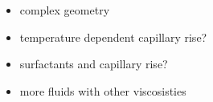 \begin{itemize}
    \item complex geometry
    \item temperature dependent capillary rise?
    \item surfactants and capillary rise?
    \item more fluids with other viscosisties
\end{itemize}
